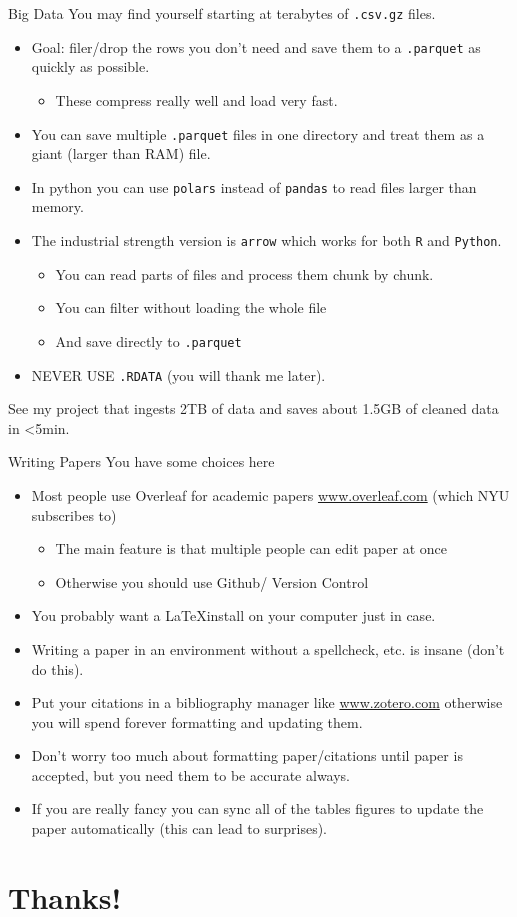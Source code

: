 \documentclass[aspectratio=169,11pt]{beamer}
\begin{document}
\begin{frame}{Big Data}
You may find yourself starting at terabytes of \texttt{.csv.gz} files.
\begin{itemize}
	\item Goal: filer/drop the rows you don't need and save them to a \texttt{.parquet} as quickly as possible.
	\begin{itemize}
		\item These compress really well and load very fast.
	\end{itemize}
	\item You can save multiple \texttt{.parquet} files in one directory and treat them as a giant (larger than RAM) file.
	\item In python you can use \texttt{polars} instead of \texttt{pandas} to read files larger than memory.
	\item The industrial strength version is \texttt{arrow} which works for both \texttt{R} and \texttt{Python}.
	\begin{itemize}
		\item You can read parts of files and process them chunk by chunk.
		\item You can filter without loading the whole file
		\item And save directly to \texttt{.parquet}
	\end{itemize}
	\item NEVER USE \texttt{.RDATA} (you will thank me later).
\end{itemize}
See my project that ingests 2TB of data and saves about 1.5GB of cleaned data in <5min.
\end{frame}



\begin{frame}{Writing Papers}
You have some choices here
\begin{itemize}
	\item Most people use Overleaf for academic papers \url{www.overleaf.com} (which NYU subscribes to)
	\begin{itemize}
		\item The main feature is that multiple people can edit paper at once
		\item Otherwise you should use Github/ Version Control
	\end{itemize}
	\item You probably want a \LaTeX install on your computer just in case.
	\item Writing a paper in an environment without a spellcheck, etc. is insane (don't do this).
	\item Put your citations in a bibliography manager like \url{www.zotero.com} otherwise you will spend forever formatting and updating them.
	\item Don't worry too much about formatting paper/citations until paper is accepted, but you need them to be \alert{accurate} always.
	\item If you are really fancy you can sync all of the tables figures to update the paper automatically (this can lead to surprises).
\end{itemize}
\end{frame}

\section*{Thanks!}
\end{document}
